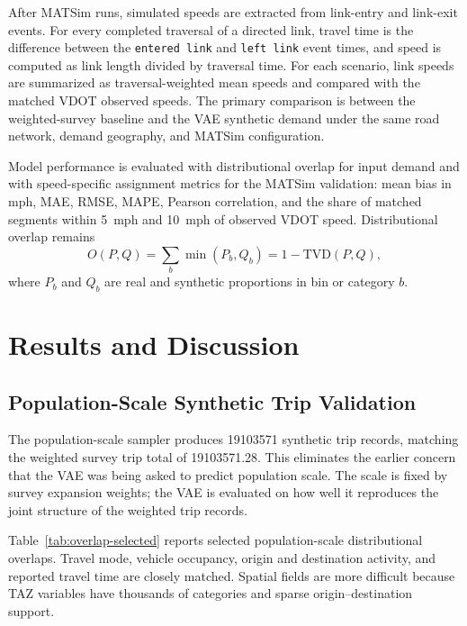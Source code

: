 \documentclass[3p,times,procedia]{elsarticle}
\begin{document}
After MATSim runs, simulated speeds are extracted from link-entry and link-exit events. For every completed traversal of a directed link, travel time is the difference between the \texttt{entered link} and \texttt{left link} event times, and speed is computed as link length divided by traversal time. For each scenario, link speeds are summarized as traversal-weighted mean speeds and compared with the matched VDOT observed speeds. The primary comparison is between the weighted-survey baseline and the VAE synthetic demand under the same road network, demand geography, and MATSim configuration.

Model performance is evaluated with distributional overlap for input demand and with speed-specific assignment metrics for the MATSim validation: mean bias in mph, MAE, RMSE, MAPE, Pearson correlation, and the share of matched segments within 5~mph and 10~mph of observed VDOT speed. Distributional overlap remains
\[
O(P,Q)=\sum_b \min(P_b,Q_b)=1-\mathrm{TVD}(P,Q),
\]
where $P_b$ and $Q_b$ are real and synthetic proportions in bin or category $b$.

\section{Results and Discussion}
\subsection{Population-Scale Synthetic Trip Validation}
The population-scale sampler produces \num{19103571} synthetic trip records, matching the weighted survey trip total of \num{19103571.28}. This eliminates the earlier concern that the VAE was being asked to predict population scale. The scale is fixed by survey expansion weights; the VAE is evaluated on how well it reproduces the joint structure of the weighted trip records.

Table~\ref{tab:overlap-selected} reports selected population-scale distributional overlaps. Travel mode, vehicle occupancy, origin and destination activity, and reported travel time are closely matched. Spatial fields are more difficult because TAZ variables have thousands of categories and sparse origin--destination support.
\end{document}
